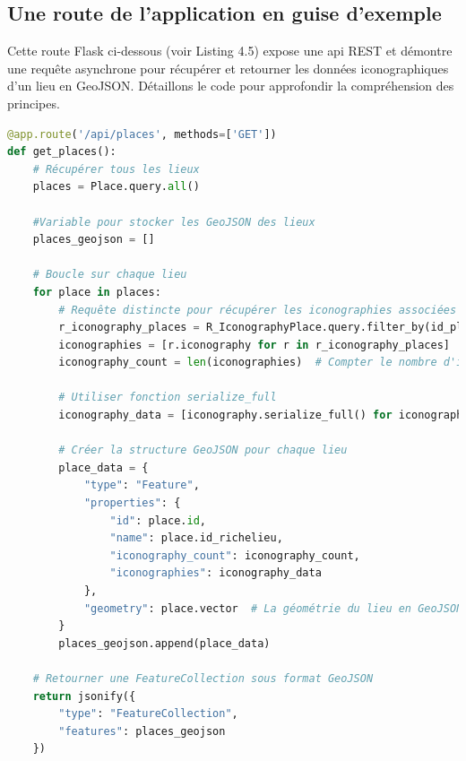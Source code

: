 \subsection{Une route de l'application en guise d'exemple}\label{sous-section:fetch-api-places}
Cette route Flask ci-dessous (voir Listing 4.5) expose une \acrshort{api} REST et démontre une requête asynchrone pour récupérer et retourner les données iconographiques d'un lieu en GeoJSON. Détaillons le code pour approfondir la compréhension des principes. 
\begin{lstlisting}[language=PYTHON, caption=Route get-places pour chercher les données iconographiques liées aux lieux et préparer le format de données à envoyer au front-end]
@app.route('/api/places', methods=['GET'])
def get_places():
    # Récupérer tous les lieux
    places = Place.query.all()

    #Variable pour stocker les GeoJSON des lieux
    places_geojson = []

    # Boucle sur chaque lieu
    for place in places:
        # Requête distincte pour récupérer les iconographies associées à ce lieu
        r_iconography_places = R_IconographyPlace.query.filter_by(id_place=place.id).all()
        iconographies = [r.iconography for r in r_iconography_places]
        iconography_count = len(iconographies)  # Compter le nombre d'iconographies pour chaque lieu

        # Utiliser fonction serialize_full 
        iconography_data = [iconography.serialize_full() for iconography in iconographies]

        # Créer la structure GeoJSON pour chaque lieu
        place_data = {
            "type": "Feature",
            "properties": {
                "id": place.id,
                "name": place.id_richelieu,
                "iconography_count": iconography_count,
                "iconographies": iconography_data
            },
            "geometry": place.vector  # La géométrie du lieu en GeoJSON
        }
        places_geojson.append(place_data)

    # Retourner une FeatureCollection sous format GeoJSON
    return jsonify({
        "type": "FeatureCollection",
        "features": places_geojson
    })\end{lstlisting}
